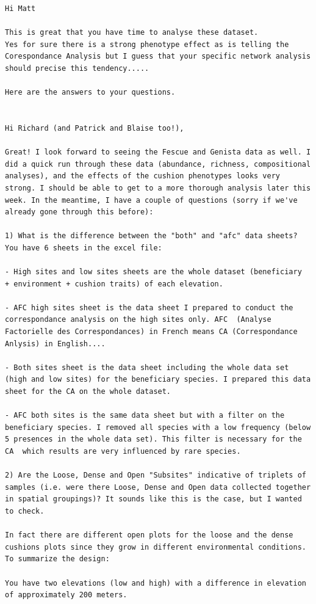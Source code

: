 \documentclass[12pt]{article}
\begin{document}
\begin{verbatim}
Hi Matt

This is great that you have time to analyse these dataset.
Yes for sure there is a strong phenotype effect as is telling the
Corespondance Analysis but I guess that your specific network analysis
should precise this tendency.....

Here are the answers to your questions.


Hi Richard (and Patrick and Blaise too!),

Great! I look forward to seeing the Fescue and Genista data as well. I
did a quick run through these data (abundance, richness, compositional
analyses), and the effects of the cushion phenotypes looks very
strong. I should be able to get to a more thorough analysis later this
week. In the meantime, I have a couple of questions (sorry if we've
already gone through this before):

1) What is the difference between the "both" and "afc" data sheets?
You have 6 sheets in the excel file:

- High sites and low sites sheets are the whole dataset (beneficiary
+ environment + cushion traits) of each elevation.

- AFC high sites sheet is the data sheet I prepared to conduct the
correspondance analysis on the high sites only. AFC  (Analyse
Factorielle des Correspondances) in French means CA (Correspondance
Anlysis) in English....

- Both sites sheet is the data sheet including the whole data set
(high and low sites) for the beneficiary species. I prepared this data
sheet for the CA on the whole dataset.

- AFC both sites is the same data sheet but with a filter on the
beneficiary species. I removed all species with a low frequency (below
5 presences in the whole data set). This filter is necessary for the
CA  which results are very influenced by rare species.

2) Are the Loose, Dense and Open "Subsites" indicative of triplets of
samples (i.e. were there Loose, Dense and Open data collected together
in spatial groupings)? It sounds like this is the case, but I wanted
to check. 

In fact there are different open plots for the loose and the dense
cushions plots since they grow in different environmental conditions.
To summarize the design:

You have two elevations (low and high) with a difference in elevation
of approximately 200 meters.


\end{verbatim}
\end{document}

